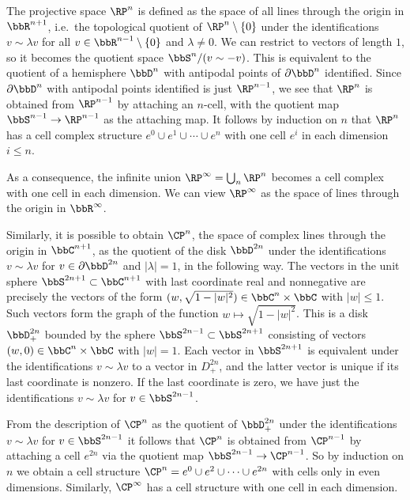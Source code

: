 \begin{example}\label{example CW structures of projective spaces}
    The projective space $\RP^n$  is defined as the space of all lines through the origin in $\bbR^{n+1}$, i.e.~the topological quotient of
    $\RP^n\setminus \{0\}$ under the identifications $v\sim\lambda v$ for all $v\in \bbR^{n-1}\setminus \{0\}$ and $\lambda\neq 0$. We can restrict to vectors of length $1$, so it becomes the quotient space $\bbS^n\slash(v\sim -v)$. This is equivalent to the quotient of a hemisphere $\bbD^n$ with antipodal points of $\partial \bbD^n$ identified. Since $\partial \bbD^n$ with antipodal points identified is just $\RP^{n-1}$, we see that $\RP^n$ is obtained from $\RP^{n-1}$ by attaching an $n$-cell, with the quotient map $\bbS^{n-1}\to \RP^{n-1}$ as the attaching map. It follows by induction on $n$ that $\RP^n$ has a cell complex structure $e^0\cup e^1\cup \cdots \cup e^n$ with one cell $e^i$ in each dimension $i\leq n$.

    As a consequence, the infinite union $\RP^\infty=\bigcup_n \RP^n$ becomes a cell complex with one cell in each dimension. We can view $\RP^\infty$ as the space of lines through the origin in $\bbR^\infty$.

    Similarly, it is possible to obtain $\CP^n$, the space of complex lines through the origin in $\bbC^{n+1}$, as the quotient of the disk $\bbD^{2n}$ under the identifications $v\sim\lambda v$ for $v\in\partial \bbD^{2n}$ and $|\lambda|=1$, in the following way. The vectors in the unit sphere $\bbS^{2n+1}\subset\bbC^{n+1}$ with last coordinate real and nonnegative are precisely the vectors of the form $(w,\sqrt{1-|w|^2})\in\bbC^n\times \bbC$ with $|w|\leq 1$. Such vectors form the graph of the function $w\mapsto \sqrt{1-|w|^2}$. This is a disk $\bbD^{2n}_+$ bounded by the sphere $\bbS^{2n-1}\subset \bbS^{2n+1}$ consisting of vectors $(w,0)\in\bbC^n\times\bbC$ with $|w|=1$. Each vector in $\bbS^{2n+1}$ is equivalent under the identifications $v\sim\lambda v$ to a vector in $D_+^{2n}$, and the latter vector is unique if its last coordinate is nonzero. If the last coordinate is zero, we have just the identifications $v\sim\lambda v$ for $v\in \bbS^{2n-1}$.

    From the description of $\CP^n$ as the quotient of $\bbD^{2n}_+$ under the identifications $v\sim\lambda v$ for $v\in \bbS^{2n-1}$ it follows that $\CP^n$ is obtained from $\CP^{n-1}$ by attaching a cell $e^{2n}$ via the quotient map $\bbS^{2n-1}\to \CP^{n-1}$. So by induction on $n$ we obtain a cell structure $\CP^n=e^0\cup e^2\cup\cdots \cup e^{2n}$ with cells only in even dimensions. Similarly, $\CP^\infty$ has a cell structure with one cell in each dimension.
\end{example}




